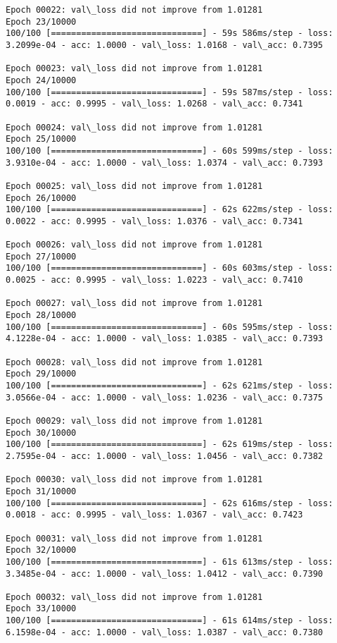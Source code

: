 \documentclass[11pt]{article}
\begin{document}
\begin{Verbatim}[commandchars=\\\{\}]
Epoch 00022: val\_loss did not improve from 1.01281
Epoch 23/10000
100/100 [==============================] - 59s 586ms/step - loss: 3.2099e-04 - acc: 1.0000 - val\_loss: 1.0168 - val\_acc: 0.7395

Epoch 00023: val\_loss did not improve from 1.01281
Epoch 24/10000
100/100 [==============================] - 59s 587ms/step - loss: 0.0019 - acc: 0.9995 - val\_loss: 1.0268 - val\_acc: 0.7341

Epoch 00024: val\_loss did not improve from 1.01281
Epoch 25/10000
100/100 [==============================] - 60s 599ms/step - loss: 3.9310e-04 - acc: 1.0000 - val\_loss: 1.0374 - val\_acc: 0.7393

Epoch 00025: val\_loss did not improve from 1.01281
Epoch 26/10000
100/100 [==============================] - 62s 622ms/step - loss: 0.0022 - acc: 0.9995 - val\_loss: 1.0376 - val\_acc: 0.7341

Epoch 00026: val\_loss did not improve from 1.01281
Epoch 27/10000
100/100 [==============================] - 60s 603ms/step - loss: 0.0025 - acc: 0.9995 - val\_loss: 1.0223 - val\_acc: 0.7410

Epoch 00027: val\_loss did not improve from 1.01281
Epoch 28/10000
100/100 [==============================] - 60s 595ms/step - loss: 4.1228e-04 - acc: 1.0000 - val\_loss: 1.0385 - val\_acc: 0.7393

Epoch 00028: val\_loss did not improve from 1.01281
Epoch 29/10000
100/100 [==============================] - 62s 621ms/step - loss: 3.0566e-04 - acc: 1.0000 - val\_loss: 1.0236 - val\_acc: 0.7375

Epoch 00029: val\_loss did not improve from 1.01281
Epoch 30/10000
100/100 [==============================] - 62s 619ms/step - loss: 2.7595e-04 - acc: 1.0000 - val\_loss: 1.0456 - val\_acc: 0.7382

Epoch 00030: val\_loss did not improve from 1.01281
Epoch 31/10000
100/100 [==============================] - 62s 616ms/step - loss: 0.0018 - acc: 0.9995 - val\_loss: 1.0367 - val\_acc: 0.7423

Epoch 00031: val\_loss did not improve from 1.01281
Epoch 32/10000
100/100 [==============================] - 61s 613ms/step - loss: 3.3485e-04 - acc: 1.0000 - val\_loss: 1.0412 - val\_acc: 0.7390

Epoch 00032: val\_loss did not improve from 1.01281
Epoch 33/10000
100/100 [==============================] - 61s 614ms/step - loss: 6.1598e-04 - acc: 1.0000 - val\_loss: 1.0387 - val\_acc: 0.7380


\end{Verbatim}
\end{document}
